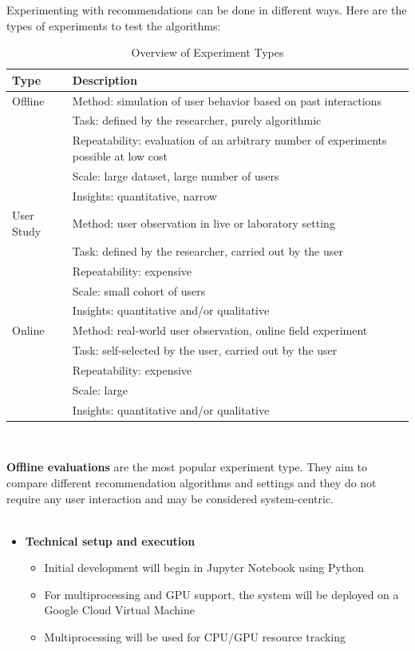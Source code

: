 \documentclass[\myFontSize,oneside,english,hidelinks,a4paper]{article}
\begin{document}
Experimenting with recommendations can be done in different ways. Here are the types of experiments to test the algorithms:
{
\renewcommand{\arraystretch}{1.5}
\begin{table}[h!]
\centering
\begin{tabular}{p{3cm}|p{10cm}}
\hline
\textbf{Type} & \textbf{Description} \\
\hline
Offline & Method: simulation of user behavior based on past interactions \\
        & Task: defined by the researcher, purely algorithmic \\
        & Repeatability: evaluation of an arbitrary number of experiments possible at low cost \\
        & Scale: large dataset, large number of users \\
        & Insights: quantitative, narrow \\
\hline
User Study & Method: user observation in live or laboratory setting \\
           & Task: defined by the researcher, carried out by the user \\
           & Repeatability: expensive \\
           & Scale: small cohort of users \\
           & Insights: quantitative and/or qualitative \\
\hline
Online & Method: real-world user observation, online field experiment \\
       & Task: self-selected by the user, carried out by the user \\
       & Repeatability: expensive \\
       & Scale: large \\
       & Insights: quantitative and/or qualitative \\
\hline
\end{tabular}

\caption{Overview of Experiment Types \cite{Zangerle2023}}
\end{table}\\
}
%
%
\textbf{Offline evaluations} are the most popular experiment type. They aim to compare different recommendation algorithms and settings and they do not require any user interaction and may be considered system-centric.  \cite{Zangerle2023}\\\\

\begin{itemize}
    \item \textbf{Technical setup and execution}
    \begin{itemize}
        \item Initial development will begin in Jupyter Notebook using Python
        \item For multiprocessing and GPU support, the system will be deployed on a Google Cloud Virtual Machine
        \item Multiprocessing will be used for CPU/GPU resource tracking
    \end{itemize}
\end{itemize}
\end{document}
